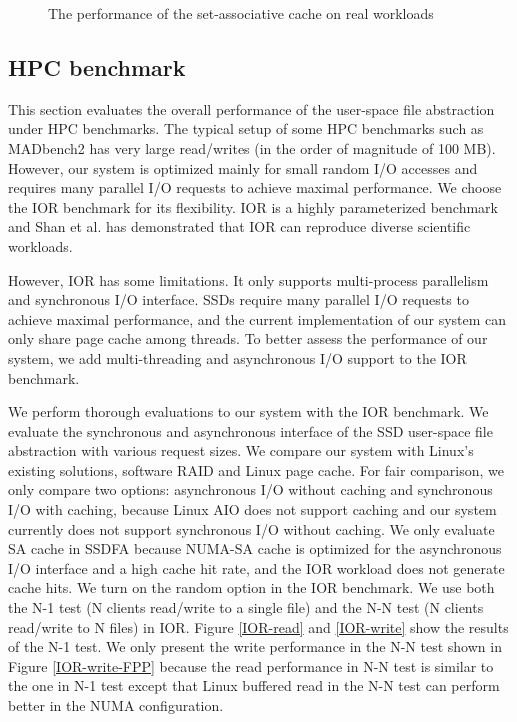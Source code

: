 \begin{figure}[tb]
\begin{center}
\vspace{-15pt}

\vspace{-15pt}
\caption{The performance of the set-associative cache on real workloads}
\label{real_workloads}
\end{center}
\end{figure}

\subsection{HPC benchmark}

This section evaluates the overall performance of the user-space file
abstraction under HPC benchmarks. The typical setup of some HPC benchmarks
such as MADbench2 \cite{madbench2} has very large read/writes (in the
order of magnitude of 100 MB). However, our system is optimized mainly
for small random I/O accesses and requires many parallel I/O requests to
achieve maximal performance. We choose the IOR benchmark \cite{IOR} for
its flexibility.
IOR is a highly parameterized benchmark and Shan et al. \cite{IOR}
has demonstrated that IOR can reproduce diverse scientific workloads.

However, IOR has some limitations. It only supports
multi-process parallelism and synchronous I/O interface. SSDs require many
parallel I/O requests to achieve maximal performance, and the current
implementation of our system can only share page cache among threads.
To better assess the performance of our system, we add multi-threading
and asynchronous I/O support to the IOR benchmark.

We perform thorough evaluations to our system with the IOR benchmark.
We evaluate the synchronous and asynchronous interface of the SSD user-space
file abstraction with various request sizes. We compare our
system with Linux's existing solutions, software RAID and Linux page cache.
For fair comparison, we only compare two options: asynchronous I/O without
caching and synchronous I/O with caching, because Linux AIO does not
support caching and our system currently does not support synchronous I/O
without caching. We only evaluate SA cache in SSDFA because NUMA-SA cache
is optimized for the asynchronous I/O interface and a high cache hit rate,
and the IOR workload does not generate cache hits. 
We turn on the random option in the IOR benchmark. We use both the N-1 test
(N clients read/write to a single file) and the N-N test (N clients read/write
to N files) in IOR. Figure \ref{IOR-read} and \ref{IOR-write} show the results
of the N-1 test. We only present the write performance in the N-N test
shown in Figure \ref{IOR-write-FPP} because the read performance in N-N test
is similar to the one in N-1 test except that Linux buffered read in the N-N
test can perform better in the NUMA configuration.

